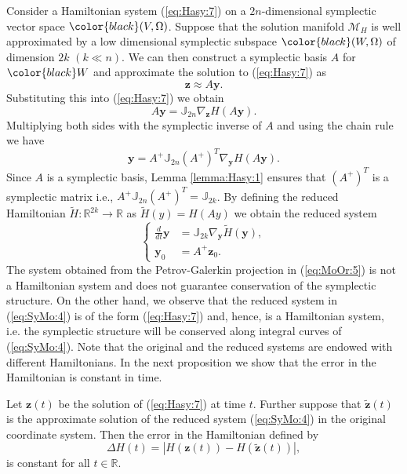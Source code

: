 \documentclass[final]{siamart}
\begin{document}
Consider a Hamiltonian system (\ref{eq:Hasy:7}) on a $2n$-dimensional symplectic vector space ${\color{black}} (V,\Omega)$. Suppose that the solution manifold $\mathcal M_H$ is well approximated by a low dimensional symplectic subspace ${\color{black}} (W,\Omega)$ of dimension $2k$ $(k\ll n)$. We can {{\color{black}} then} construct a symplectic basis $A$ for ${\color{black}} W$ and approximate the solution to (\ref{eq:Hasy:7}) as
\begin{equation} \label{eq:SyMo:1}
	\mathbf z \approx A\mathbf y.
\end{equation}
Substituting this into (\ref{eq:Hasy:7}) we obtain
\begin{equation} \label{eq:SyMo:2}
	A\mathbf y = \mathbb{J}_{2n} \nabla_{\mathbf z} H(A \mathbf y). 
\end{equation}
Multiplying both sides with the symplectic inverse of $A$ and using the chain rule we have
\begin{equation} \label{eq:SyMo:3}
	\mathbf y = A^+ \mathbb J_{2n} (A^+)^T \nabla_{\mathbf y} H(A\mathbf y).
\end{equation}
Since $A$ is a symplectic basis, Lemma \ref{lemma:Hasy:1} ensures that $(A^+)^T$ is a symplectic matrix i.e., $A^+ \mathbb J_{2n} (A^+)^T = \mathbb{J}_{2k}$. By defining the reduced Hamiltonian $\tilde H:\mathbb R^{2k} \to \mathbb R$ as $\tilde H (y) = H(Ay)$ we obtain the reduced system
\begin{equation} \label{eq:SyMo:4}
\left\{
\begin{aligned}
	 \frac{d}{dt} \mathbf y &= \mathbb J_{2k} \nabla_{\mathbf y} \tilde H(\mathbf y), \\
	 \mathbf y_0 &= A^+ \mathbf z_0.
\end{aligned}
\right.
\end{equation}
The system obtained from the Petrov-Galerkin projection in (\ref{eq:MoOr:5}) is not a Hamiltonian system and does not guarantee conservation of the symplectic structure. On the other hand, we observe that the reduced system in (\ref{eq:SyMo:4}) is of the form (\ref{eq:Hasy:7}) and, hence, is a Hamiltonian system, i.e. the symplectic structure will be conserved along integral curves of (\ref{eq:SyMo:4}). Note that the original and the reduced systems are {{\color{black}} endowed with} different Hamiltonians. In the next proposition we show that the error in the Hamiltonian is constant in time. 

\begin{proposition}
Let $\mathbf{z} (t)$ be the solution of (\ref{eq:Hasy:7}) at time $t$. Further suppose that $\tilde{\mathbf{z}} (t)$ is the approximate solution of the reduced system (\ref{eq:SyMo:4}) in the original coordinate system. Then the error in the Hamiltonian defined by
\begin{equation} \label{eq:SyMo:5}
	\Delta H(t)  = |H(\mathbf z(t)) - H(\tilde{\mathbf z}(t))|,
\end{equation}
is constant for all $t\in \mathbb R$.
\end{proposition}
\end{document}
